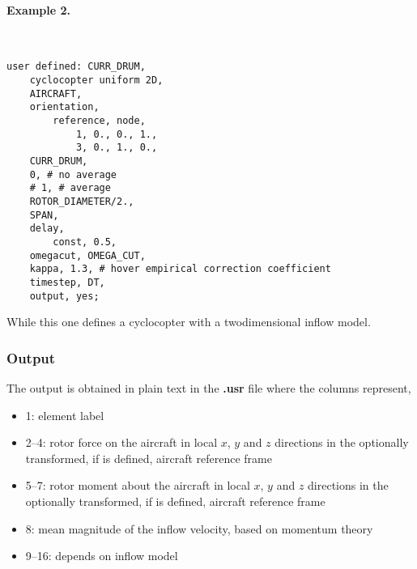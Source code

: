 \paragraph{Example 2.} \
\begin{verbatim}
user defined: CURR_DRUM,
    cyclocopter uniform 2D,
    AIRCRAFT,
    orientation,
        reference, node,
    	    1, 0., 0., 1.,
    	    3, 0., 1., 0.,
    CURR_DRUM,
    0, # no average
    # 1, # average
    ROTOR_DIAMETER/2.,
    SPAN,
    delay,
        const, 0.5,
    omegacut, OMEGA_CUT,
    kappa, 1.3, # hover empirical correction coefficient
    timestep, DT,
    output, yes;	
\end{verbatim}
While this one defines a cyclocopter with a twodimensional inflow model.


\subsubsection{Output}
The output is obtained in plain text in the \textbf{.usr} file where the columns represent,
\begin{itemize}
\item 1: element label
\item 2--4: rotor force on the aircraft in local $x$, $y$ and $z$ directions in the optionally transformed, if  is defined, aircraft reference frame  %
\item 5--7: rotor moment about the aircraft in local $x$, $y$ and $z$ directions in the optionally transformed, if \bnt{orientation} is defined, aircraft reference frame %
\item 8:  mean magnitude of the inflow velocity, based on momentum theory %
\item 9--16: depends on inflow model
\end{itemize}




